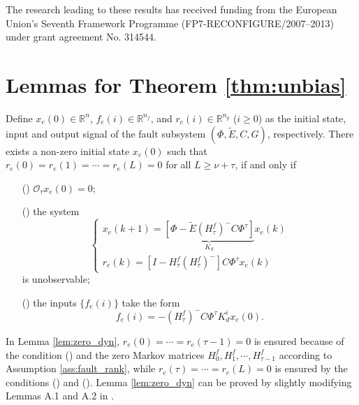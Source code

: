 \documentclass[twocolumn]{autart}
\begin{document}
\begin{ack}                               The research leading to these results has received funding from the European Union's Seventh Framework Programme (FP7-RECONFIGURE/2007--2013) under grant agreement No. 314544.  \end{ack}

                   


\appendix
\section{Lemmas for Theorem \ref{thm:unbias}}\label{app:property}

\begin{lem}\label{lem:zero_dyn}
Define $x_{e}(0) \in \mathbb{R}^n$, $f_{e}(i) \in \mathbb{R}^{n_f}$, and $r_{e}(i) \in \mathbb{R}^{n_y}$ ($i \geq 0$) as the initial state, input and output signal of the fault subsystem $(\Phi, \tilde E, C, G)$, respectively. 
There exists a non-zero initial state $x_{e}(0)$ such that $r_{e}(0) = r_{e}(1) = \cdots = r_{e}(L) = 0$ for all $L \geq \nu+\tau$, if and only if 
\begin{enumerate}
	\item[(\romannumeral1)] $\mathcal{O}_{\tau} x_{e}(0) =0$;
	\item[(\romannumeral2)] the system
		\begin{equation}\label{eq:zero_init_cond}
		\left\{ \begin{array}{l}
		x_{e}(k+1) = \underbrace{\left[\Phi - \tilde E \left( H_\tau^f \right)^- C \Phi^\tau \right]}_{K_d} x_{e}(k) \\
		r_{e}(k) = \left[ I - H_\tau^f \left( H_\tau^f \right)^- \right] C  \Phi^\tau x_{e}(k) 
		\end{array} \right.
		\end{equation}
		is unobservable;
	\item[(\romannumeral3)] the inputs $\{f_{e}(i)\}$ take the form
		\begin{equation}\label{eq:zero_f}
		f_{e}(i) = - \left( H_\tau^f \right)^- C \Phi^\tau K_d^i x_{e}(0).
		\end{equation}
\end{enumerate}
\end{lem}


In Lemma \ref{lem:zero_dyn}, $r_{e}(0) = \cdots = r_{e}(\tau-1) = 0$ is ensured because of the condition () and the zero Markov matrices $H_0^f, H_1^f, \cdots, H_{\tau-1}^f$ according to Assumption \ref{ass:fault_rank}, while $r_{e}(\tau) = \cdots = r_{e}(L) = 0$ is ensured by the conditions () and ().
Lemma \ref{lem:zero_dyn} can be proved by slightly modifying Lemmas A.1 and A.2 in \cite{Kirt2011}.
\end{document}
